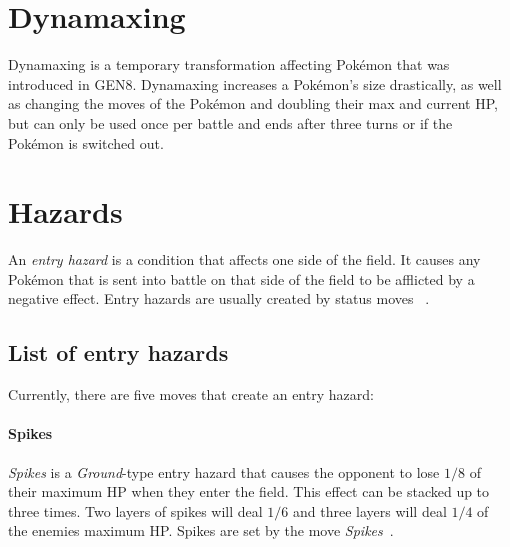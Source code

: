 \section{Dynamaxing}
\label{sec:dynamax}
Dynamaxing is a temporary transformation affecting Pokémon that was introduced in \ac{GEN8}. Dynamaxing increases
a Pokémon's size drastically, as well as changing the moves of the Pokémon and doubling their max and current \ac{HP},
but can only be used once per battle and ends after three turns or if the Pokémon is switched out.

\section{Hazards}
\label{sec:hazards}
An \textit{entry hazard} is a condition that affects one side of the field. It causes
any Pokémon that is sent into battle on that side of the field to be afflicted by 
a negative effect. Entry hazards are usually created by status moves
~\autocite{Bulbapedia:EntryHazards}. 
\subsection{List of entry hazards}
Currently, there are five moves that create an entry hazard:

\paragraph{Spikes}
\textit{Spikes} is a \textit{Ground}-type entry hazard that causes the opponent
to lose $1/8$ of their maximum \ac{HP} when they enter the field. This
effect can be stacked up to three times. Two layers of spikes will deal
$1/6$ and three layers will deal $1/4$ of the enemies maximum \ac{HP}.
Spikes are set by the move \textit{Spikes}~\autocite{Bulbapedia:Spikes}.

